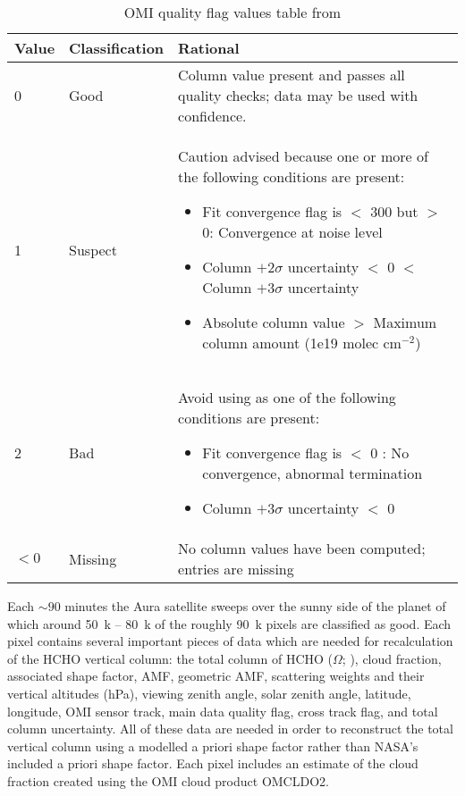     \begin{table}
      \caption{OMI quality flag values table from \textcite{Kurosu2014}}
      \begin{tabular}{  l  l  p{10cm} }
        \hline
        \textbf{Value} & \textbf{Classification} & \textbf{Rational} 
        \\ \hline
        0 & Good & Column value present and passes all quality checks; data may be used with confidence. 
        \\ \hline
        1 & Suspect & Caution advised because one or more of the following conditions are present: 
        \begin{itemize}
          \item Fit convergence flag is $<$ 300 but $>$ 0: Convergence at noise level
          \item Column $+ 2 \sigma$ uncertainty $<$ 0 $<$ Column $ + 3 \sigma $ uncertainty
          \item Absolute column value $>$ Maximum column amount (1e19 molec cm$^{-2}$)
        \end{itemize}
        \\ \hline
        2 & Bad & Avoid using as one of the following conditions are present: 
        \begin{itemize}
          \item Fit convergence flag is $<$ 0 : No convergence, abnormal termination
          \item Column $+ 3 \sigma$ uncertainty $<$ 0
        \end{itemize}
        \\ \hline
        $<0$ & Missing & No column values have been computed; entries are missing
        \\ \hline
      \end{tabular}
      \label{Model:datasets:OMHCHO:tab_qflag}
    \end{table}
    
    Each $\sim90$ minutes the Aura satellite sweeps over the sunny side of the planet of which around 50~k -- 80~k of the roughly 90~k pixels are classified as good.
    Each pixel contains several important pieces of data which are needed for recalculation of the HCHO vertical column: the total column of HCHO ($\Omega$; \moleccm), cloud fraction, associated shape factor, AMF, geometric AMF, scattering weights and their vertical altitudes (hPa), viewing zenith angle, solar zenith angle, latitude, longitude, OMI sensor track, main data quality flag, cross track flag, and total column uncertainty.
    All of these data are needed in order to reconstruct the total vertical column using a modelled a priori shape factor rather than NASA's included a priori shape factor.
    Each pixel includes an estimate of the cloud fraction created using the OMI cloud product OMCLDO2.
    
